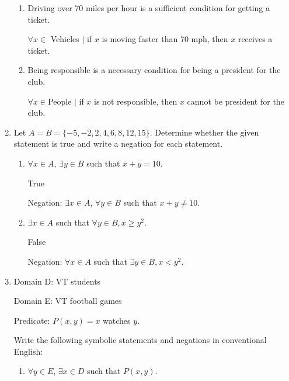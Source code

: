 \documentclass[12pt,letterpaper,titlepage]{article}
\begin{document}
\begin{raggedright}
\begin{enumerate}
  \begin{enumerate}[label=(\alph*)]
    \item Driving over 70 miles per hour is a sufficient condition for getting a ticket.
    
	  $\forall x \in$ Vehicles $|$ if $x$ is moving faster than 70 mph, then $x$ receives a ticket.
    
    \item Being responsible is a necessary condition for being a president for the club.

	  $\forall x \in $People $|$ if $x$ is not responsible, then $x$ cannot be president for the club.

  \end{enumerate}


\item Let $A = B = \{−5, −2, 2, 4, 6, 8, 12, 15\}$. Determine whether the given statement is true and write a negation for each statement.

  \begin{enumerate}[label=(\alph*)]
    \item $\forall x \in A$, $\exists y \in B$ such that $x + y = 10$.

	  True
	  
	  Negation: $\exists x \in A$, $\forall y \in B$ such that $x + y \neq 10$.
    
    \item $\exists x \in A$ such that $\forall y \in B, x \geq y^2$.
    
	  False

	  Negation: $\forall x \in A$ such that $\exists y \in B, x < y^2$.
    
  \end{enumerate}


\item
Domain D: VT students 

Domain E: VT football games 

Predicate: $P(x, y) = x$ watches $y$. 

Write the following symbolic statements and negations in conventional English:

  \begin{enumerate}[label=(\alph*)]
    \item $\forall y \in E$, $\exists x \in D$ such that $P(x, y)$.
    

\end{enumerate}
\end{enumerate}
\end{raggedright}
\end{document}
